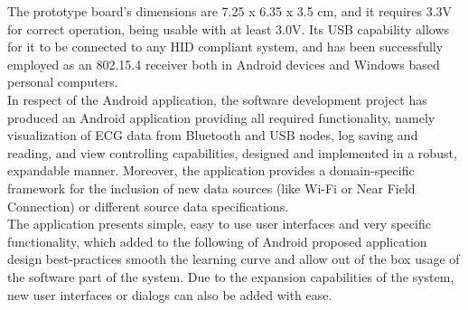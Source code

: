		The prototype board's dimensions are 7.25 x 6.35 x 3.5 cm, and it requires 3.3V for correct operation, being usable with at least 3.0V. Its USB capability allows for it to be connected to any HID compliant system, and has been successfully employed as an 802.15.4 receiver both in Android devices and Windows based personal computers.\\

		In respect of the Android application, the software development project has produced an Android application providing all required functionality, namely visualization of ECG data from Bluetooth and USB nodes, log saving and reading, and view controlling capabilities, designed and implemented in a robust, expandable manner. Moreover, the application provides a domain-specific framework for the inclusion of new data sources (like Wi-Fi or Near Field Connection) or different source data specifications.\\

		The application presents simple, easy to use user interfaces and very specific functionality, which added to the following of Android proposed application design best-practices smooth the learning curve and allow out of the box usage of the software part of the system. Due to the expansion capabilities of the system, new user interfaces or dialogs can also be added with ease.\\
	

